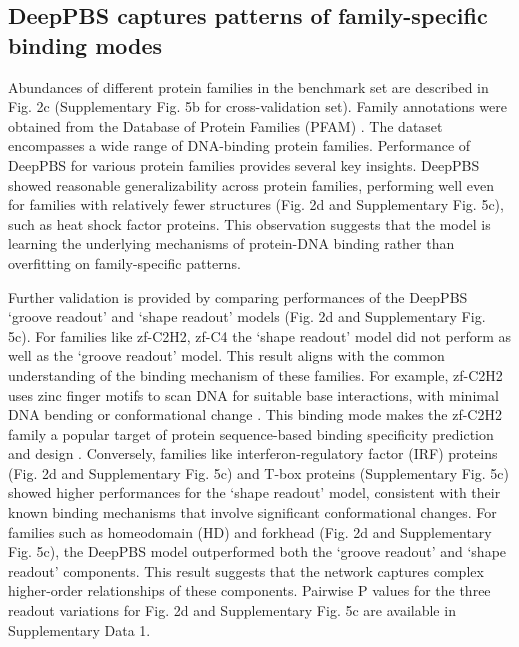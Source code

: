 \subsection{DeepPBS captures patterns of family-specific binding modes}
Abundances of different protein families in the benchmark set are described in Fig. 2c (Supplementary Fig. 5b for cross-validation set). Family annotations were obtained from the Database of Protein Families (PFAM) \citep{Mistry2021}. The dataset encompasses a wide range of DNA-binding protein families. Performance of DeepPBS for various protein families provides several key insights. DeepPBS showed reasonable generalizability across protein families, performing well even for families with relatively fewer structures (Fig. 2d and Supplementary Fig. 5c), such as heat shock factor proteins. This observation suggests that the model is learning the underlying mechanisms of protein-DNA binding rather than overfitting on family-specific patterns.
\par
Further validation is provided by comparing performances of the DeepPBS ‘groove readout’ and ‘shape readout’ models (Fig. 2d and Supplementary Fig. 5c). For families like zf-C2H2, zf-C4 the ‘shape readout’ model did not perform as well as the ‘groove readout’ model. This result aligns with the common understanding of the binding mechanism of these families. For example, zf-C2H2 uses zinc finger motifs to scan DNA for suitable base interactions, with minimal DNA bending or conformational change \citep{Persikov2011}. This binding mode makes the zf-C2H2 family a popular target of protein sequence-based binding specificity prediction and design \citep{Persikov2014, persikov2009predicting, Sofia2022, Yanover2011, Ichikawa2023}. Conversely, families like interferon-regulatory factor (IRF) proteins (Fig. 2d and Supplementary Fig. 5c) and T-box proteins (Supplementary Fig. 5c) showed higher performances for the ‘shape readout’ model, consistent with their known binding mechanisms that involve significant conformational changes\citep{Stirnimann2010, Escalante1998}. For families such as homeodomain (HD) and forkhead (Fig. 2d and Supplementary Fig. 5c), the DeepPBS model outperformed both the ‘groove readout’ and ‘shape readout’ components. This result suggests that the network captures complex higher-order relationships of these components. Pairwise P values for the three readout variations for Fig. 2d and Supplementary Fig. 5c are available in Supplementary Data 1.

